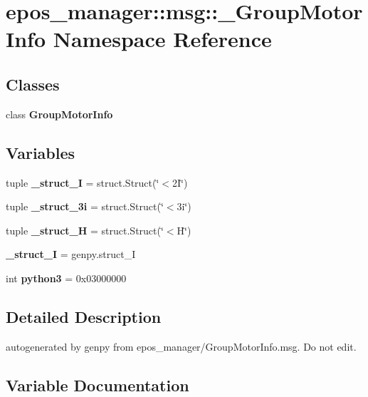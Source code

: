\section{epos\-\_\-manager\-:\-:msg\-:\-:\-\_\-\-Group\-Motor\-Info \-Namespace \-Reference}
\label{namespaceepos__manager_1_1msg_1_1__GroupMotorInfo}
\subsection*{\-Classes}
\begin{DoxyCompactItemize}
\item 
class {\bf \-Group\-Motor\-Info}
\end{DoxyCompactItemize}
\subsection*{\-Variables}
\begin{DoxyCompactItemize}
\item 
tuple {\bf \-\_\-struct\-\_\-I} = struct.\-Struct(\char`\"{}$<$2\-I\char`\"{})
\item 
tuple {\bf \-\_\-struct\-\_\-3i} = struct.\-Struct(\char`\"{}$<$3i\char`\"{})
\item 
tuple {\bf \-\_\-struct\-\_\-\-H} = struct.\-Struct(\char`\"{}$<$\-H\char`\"{})
\item 
{\bf \-\_\-struct\-\_\-\-I} = genpy.\-struct\-\_\-\-I
\item 
int {\bf python3} = 0x03000000
\end{DoxyCompactItemize}


\subsection{\-Detailed \-Description}
\begin{DoxyVerb}autogenerated by genpy from epos_manager/GroupMotorInfo.msg. Do not edit.\end{DoxyVerb}
 

\subsection{\-Variable \-Documentation}
